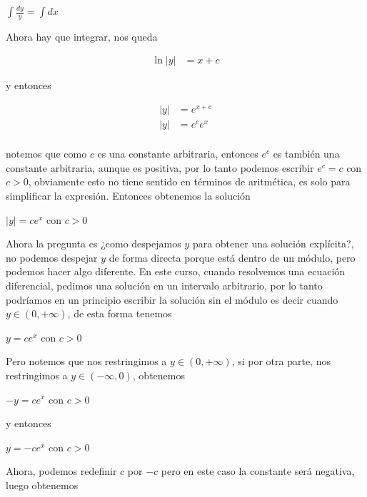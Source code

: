 \documentclass{article}
\theoremstyle{plain}
\theoremstyle{definition}
\begin{document}
\begin{center}
$\displaystyle \int \frac{dy}{y}= \int dx$
\end{center}

Ahora hay que integrar, nos queda

\begin{align*}
    \ln|y| &= x+c
\end{align*}

y entonces

\begin{align*}
    |y| &= e^{x+c} \\
    |y| &= e^ce^{x} \\
\end{align*}

notemos que como $c$ es una constante arbitraria, entonces $e^c$ es también una constante arbitraria, aunque es positiva, por lo tanto podemos escribir $e^c=c$ con $c>0$, obviamente esto no tiene sentido en términos de aritmética, es solo para simplificar la expresión. Entonces obtenemos la solución

\begin{center}
$|y|=ce^x$ con $c > 0$
\end{center}


Ahora la pregunta es ¿como despejamos $y$ para obtener una solución explícita?, no podemos despejar $y$ de forma directa porque está dentro de un módulo, pero podemos hacer algo diferente. En este curso, cuando resolvemos una ecuación diferencial, pedimos una solución en un intervalo arbitrario, por lo tanto podríamos en un principio escribir la solución sin el módulo es decir cuando $y \in (0,+\infty)$, de esta forma tenemos



\begin{center}
$y=ce^x$ con $c > 0$
\end{center}

Pero notemos que nos restringimos a $y \in (0,+\infty)$, si por otra parte, nos restringimos a $y \in (-\infty,0 )$, obtenemos

\begin{center}
$-y=ce^x$ con $c>0$
\end{center}

y entonces

\begin{center}
$y=-ce^x$ con $c>0$
\end{center}

Ahora,  podemos redefinir $c$ por $-c$ pero en este caso la constante será negativa, luego obtenemos
\end{document}
